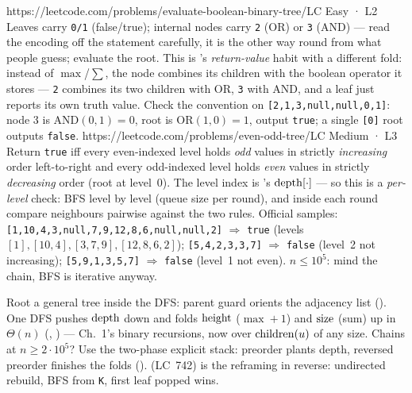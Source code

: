 \begin{practiceset}
    {https://leetcode.com/problems/evaluate-boolean-binary-tree/}{LC Easy · L2}
    {Leaves carry \texttt{0/1} (false/true); internal nodes carry \texttt{2} (OR) or
    \texttt{3} (AND) --- read the encoding off the statement carefully, it is the other
    way round from what people guess; evaluate the root. This is 's
    \emph{return-value}
    habit with a different fold: instead of $\max$/$\sum$, the node combines its children
    with the boolean operator it stores --- \texttt{2} combines its two children with
    OR, \texttt{3} with AND, and a leaf just reports its own truth value.
    Check the convention on \texttt{[2,1,3,null,null,0,1]}: node 3 is
    $\mathrm{AND}(0,1)=0$, root is $\mathrm{OR}(1,0)=1$, output \texttt{true}; a
    single \texttt{[0]} root outputs \texttt{false}.}
    {https://leetcode.com/problems/even-odd-tree/}{LC Medium · L3}
    {Return \texttt{true} iff every even-indexed level holds \emph{odd} values in
    strictly \emph{increasing} order left-to-right and every odd-indexed level holds
    \emph{even} values in strictly \emph{decreasing} order (root at level~0). The level
    index is 's $\operatorname{depth}[\cdot]$ --- so this is a \emph{per-level}
    check: BFS level by level (queue size per round), and inside each round compare
    neighbours pairwise against the two rules. Official samples:
    \texttt{[1,10,4,3,null,7,9,12,8,6,null,null,2]} $\Rightarrow$ \texttt{true} (levels
    $[1],[10,4],[3,7,9],[12,8,6,2]$); \texttt{[5,4,2,3,3,7]} $\Rightarrow$
    \texttt{false} (level~2 not increasing); \texttt{[5,9,1,3,5,7]} $\Rightarrow$
    \texttt{false} (level~1 not even). $n \le 10^{5}$: mind the chain, BFS is iterative
    anyway.}
\end{practiceset}

\begin{recallbox}
Root a general tree inside the DFS: parent guard orients the adjacency list
(). One DFS pushes $\operatorname{depth}$ down and folds $\operatorname{height}$
($\max+1$) and $\operatorname{size}$ (sum) up in $\Theta(n)$ (,
) --- Ch.~1's binary recursions, now over $\operatorname{children}(u)$ of any
size. Chains at $n\ge 2\cdot 10^{5}$? Use the two-phase explicit stack: preorder plants
depth, reversed preorder finishes the folds (). 
(LC~742) is the reframing in reverse: undirected rebuild, BFS from \texttt{K}, first
leaf popped wins.
\end{recallbox}
